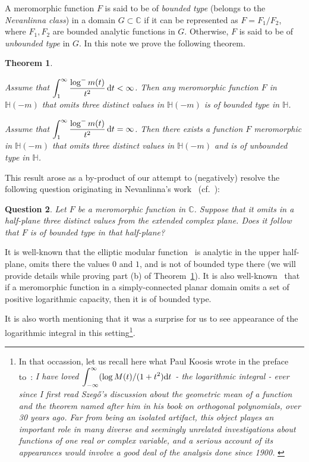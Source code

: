 \documentclass[12pt]{paper}
\newtheorem{theorem}{Theorem}
\newtheorem{question}[theorem]{Question}
\newcommand{\bC}{\mathbb C}
\newcommand{\bH}{\mathbb H}
\begin{document}
A meromorphic function $F$ is said to be of {\em bounded type} (belongs to the {\em Nevanlinna class}) 
in a domain $G\subset \bC$  if it can be represented as $F=F_1/F_2$, where $F_1, F_2$ are bounded analytic 
functions in $G$. Otherwise, $F$ is said to be of {\em unbounded type} in $G$. In this note we prove the 
following theorem.

\begin{theorem}\label{main_thm} \mbox{}

\medskip{} Assume that $\displaystyle \int_1^\infty \frac{\log^- m(t)}{t^2}\, {\rm d}t<\infty$.
Then any meromorphic function $F$ in $\bH(-m)$ that omits three distinct values  in $\bH(-m)$
is of bounded type in $\bH$.

\smallskip{} Assume that $\displaystyle \int_1^\infty \frac{\log^- m(t)}{t^2}\, {\rm d}t =\infty$. 
Then there exists a function $F$ meromorphic in $\bH(-m)$ that omits three distinct values in $\bH(-m)$ and is of 
unbounded type in $\bH$.

\end{theorem}
This result arose as a by-product of our attempt to (negatively) resolve the following question originating in Nevanlinna's work~\cite{Nev} (cf.~\cite[item 6]{Ostr}):

\begin{question}\label{quest_Nevanlinna}
Let $F$ be a meromorphic function in $\bC$.
Suppose that it omits in a half-plane three distinct values from the extended complex plane.
Does it follow that $F$ is of bounded type in that half-plane?
\end{question}

It is well-known that the elliptic modular function~\cite[Chapter~7, Section~3.4]{Ahlfors} is analytic in the upper half-plane, 
omits there the values $0$ and $1$, and is not of bounded type there (we will provide details while proving part (b) 
of Theorem~\ref{main_thm}). It is also 
well-known~\cite[Chapter~VI \S4 and Chapter~VII \S1]{Nev-book} that if a meromorphic function
in a simply-connected planar domain  omits a set of positive logarithmic capacity, then it is of bounded type. 

It is also worth mentioning that it 
was a surprise for us to see appearance of the logarithmic integral in this setting\footnote
{In that occassion, let us recall here what Paul Koosis wrote in the preface to~\cite{Koosis}:
{\em
I have loved $\displaystyle \int_{-\infty}^\infty (\log M(t)/(1+t^2) {\rm d}t$ - the logarithmic integral - 
ever since I first read Szeg\H{o}'s discussion about the geometric mean of a function and the theorem 
named after him in his book on orthogonal polynomials, over 30 years ago. Far from being an isolated artifact, this object playes an important role in many diverse and seemingly unrelated investigations 
about functions of one real or complex variable, and a serious account of its appearances would involve
a good deal of the analysis done since 1900.
}}.
\end{document}
